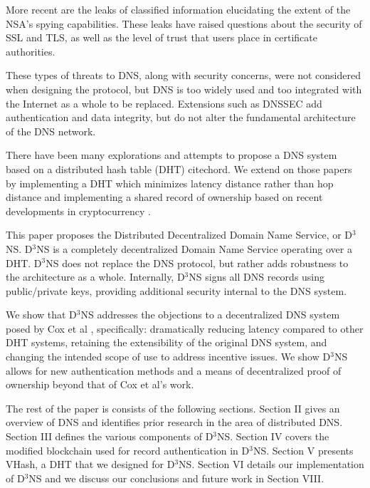 \documentclass[11pt]{IEEEtran} %
\begin{document}
More recent are the leaks of classified information elucidating the extent of the NSA's spying capabilities. These leaks have raised questions about the security of SSL and TLS, as well as the level of trust that users place in certificate authorities.


These types of threats to DNS, along with security concerns, were not considered when designing the protocol, but DNS is too widely used and too integrated with the Internet as a whole to be replaced. Extensions such as DNSSEC \cite{blacka2013clarifications} add authentication and data integrity, but do not alter the fundamental architecture of the DNS network.


There have been many explorations and attempts \cite{cox} \cite{pappas} \cite{ramasubramanian2004design} to propose a DNS system based on a distributed hash table (DHT) cite{chord}. We extend on those papers by implementing a DHT which minimizes latency distance rather than hop distance and implementing a shared record of ownership based on recent developments in cryptocurrency \cite{namecoin} \cite{bitcoin}.


This paper proposes the Distributed Decentralized Domain Name Service, or D$^{3}$NS.  D$^{3}$NS is a completely decentralized Domain Name Service operating over a DHT.  D$^{3}$NS does not replace the DNS protocol, but rather adds robustness to the architecture as a whole.  Internally, D$^3$NS signs all DNS records using public/private keys, providing additional security internal to the DNS system.

We show that D$^{3}$NS addresses the objections to a decentralized DNS system posed by Cox et al \cite{cox}, specifically: dramatically reducing latency compared to other DHT systems, retaining the extensibility of the original DNS system, and changing the intended scope of use to address incentive issues. We show D$^{3}$NS allows for new authentication methods and a means of decentralized proof of ownership beyond that of Cox et al's work. 


The rest of the paper is consists of the following sections.  Section II gives an overview of DNS and identifies prior research in the area of distributed DNS.  Section III defines the various components of D$^3$NS.  Section IV covers the modified blockchain used for record authentication in D$^3$NS.  Section V presents VHash, a DHT that we designed for D$^3$NS.  Section VI details our implementation of D$^3$NS and  we discuss our conclusions and future work in Section VIII.
\end{document}
